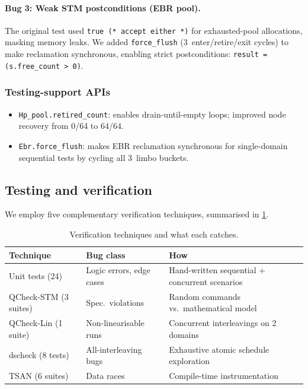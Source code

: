 \documentclass[11pt,a4paper]{article}
\begin{document}
\paragraph{Bug 3: Weak STM postconditions (EBR pool).}
The original test used \lstinline{true (* accept either *)} for exhausted-pool
allocations, masking memory leaks.  We added \texttt{force\_flush}
(3~enter/retire/exit cycles) to make reclamation synchronous, enabling strict
postconditions: \lstinline{result = (s.free_count > 0)}.

\subsubsection{Testing-support APIs}

\begin{itemize}[nosep]
  \item \texttt{Hp\_pool.retired\_count}: enables drain-until-empty loops;
    improved node recovery from 0/64 to 64/64.
  \item \texttt{Ebr.force\_flush}: makes EBR reclamation synchronous for
    single-domain sequential tests by cycling all 3~limbo buckets.
\end{itemize}

\subsection{Testing and verification}
\label{sec:testing}

We employ five complementary verification techniques, summarised in
\cref{tab:testing}.

\begin{table}[ht]
\centering\small
\caption{Verification techniques and what each catches.}
\label{tab:testing}
\begin{tabular}{@{}llp{4.8cm}@{}}
\toprule
\textbf{Technique} & \textbf{Bug class} & \textbf{How} \\
\midrule
Unit tests (24) & Logic errors, edge cases & Hand-written sequential +
  concurrent scenarios \\
QCheck-STM (3 suites) & Spec.\ violations & Random commands vs.\
  mathematical model \\
QCheck-Lin (1 suite) & Non-linearisable runs & Concurrent interleavings
  on 2 domains \\
dscheck (8 tests) & All-interleaving bugs & Exhaustive atomic schedule
  exploration \\
TSAN (6 suites) & Data races & Compile-time instrumentation \\
\bottomrule
\end{tabular}
\end{table}
\end{document}
